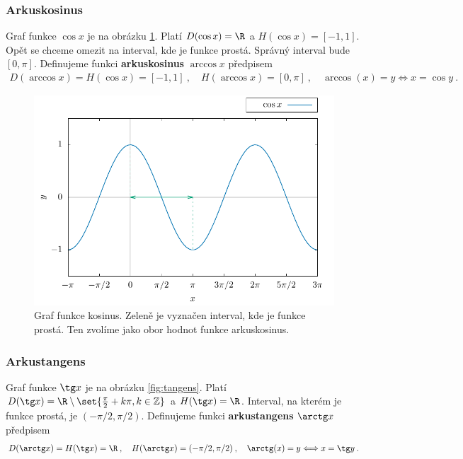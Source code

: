 \subsubsection*{Arkuskosinus}

Graf funkce $\cos x$ je na obrázku \ref{fig:kosinus}. Platí $D(\cos x) = \R$ a $H(\cos x) = [-1,1]$. Opět se chceme omezit na interval, kde je funkce prostá. Správný interval bude $[0,\pi]$. Definujeme funkci \textbf{arkuskosinus} $\arccos x$ předpisem \begin{align}
    D(\arccos x) = H(\cos x) = [-1,1] \:, \quad H(\arccos x) = [0, \pi] \:, \quad \arccos(x) = y \Longleftrightarrow x = \cos y \:.
\end{align}

\begin{figure}[H]
    \centering
    \includegraphics{Gnuplot/cv1/Figures/cosinusgraf.pdf}
    \caption{Graf funkce kosinus. Zeleně je vyznačen interval, kde je funkce prostá. Ten zvolíme jako obor hodnot funkce arkuskosinus.}
    \label{fig:kosinus}
\end{figure}

\subsubsection*{Arkustangens}

Graf funkce $\tg x$ je na obrázku \ref{fig:tangens}. Platí $D(\tg x) = \R \setminus \set{\frac{\pi}{2}+ k \pi, k \in \mathbb{Z}}$ a $H(\tg x) = \R$. Interval, na kterém je funkce prostá, je $(-\pi/2, \pi/2)$. Definujeme funkci \textbf{arkustangens} $\arctg x$ předpisem \begin{align}
    D(\arctg x) = H(\tg x) = \R \:, \quad H(\arctg x) = (-\pi/2, \pi/2) \:, \quad \arctg(x) = y \Longleftrightarrow x = \tg y \:.
\end{align}


